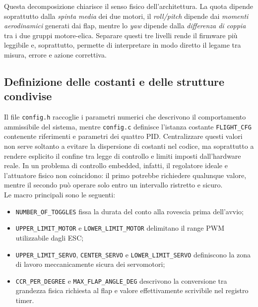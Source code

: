 \documentclass[11pt]{report}
\begin{document}
	Questa decomposizione chiarisce il senso fisico dell'architettura. La quota dipende soprattutto dalla \emph{spinta media} dei due motori, il \textit{roll/pitch} dipende dai \emph{momenti aerodinamici} generati dai flap, mentre lo \textit{yaw} dipende dalla \emph{differenza di coppia} tra i due gruppi motore-elica. Separare questi tre livelli rende il firmware più leggibile e, soprattutto, permette di interpretare in modo diretto il legame tra misura, errore e azione correttiva.
	
	\subsection{Definizione delle costanti e delle strutture condivise}
	Il file \texttt{config.h} raccoglie i parametri numerici che descrivono il comportamento ammissibile del sistema, mentre \texttt{config.c} definisce l'istanza costante \texttt{FLIGHT\_CFG} contenente riferimenti e parametri dei quattro PID. Centralizzare questi valori non serve soltanto a evitare la dispersione di costanti nel codice, ma soprattutto a rendere esplicito il confine tra legge di controllo e limiti imposti dall'hardware reale. In un problema di controllo embedded, infatti, il regolatore ideale e l'attuatore fisico non coincidono: il primo potrebbe richiedere qualunque valore, mentre il secondo può operare solo entro un intervallo ristretto e sicuro.\\
	Le macro principali sono le seguenti:
	\begin{itemize}
		\item \texttt{NUMBER\_OF\_TOGGLES} fissa la durata del conto alla rovescia prima dell'avvio;
		\item \texttt{UPPER\_LIMIT\_MOTOR} e \texttt{LOWER\_LIMIT\_MOTOR} delimitano il range PWM utilizzabile dagli ESC;
		\item \texttt{UPPER\_LIMIT\_SERVO}, \texttt{CENTER\_SERVO} e \texttt{LOWER\_LIMIT\_SERVO} definiscono la zona di lavoro meccanicamente sicura dei servomotori;
		\item \texttt{CCR\_PER\_DEGREE} e \texttt{MAX\_FLAP\_ANGLE\_DEG} descrivono la conversione tra grandezza fisica richiesta al flap e valore effettivamente scrivibile nel registro timer.
	\end{itemize}
	
\end{document}
